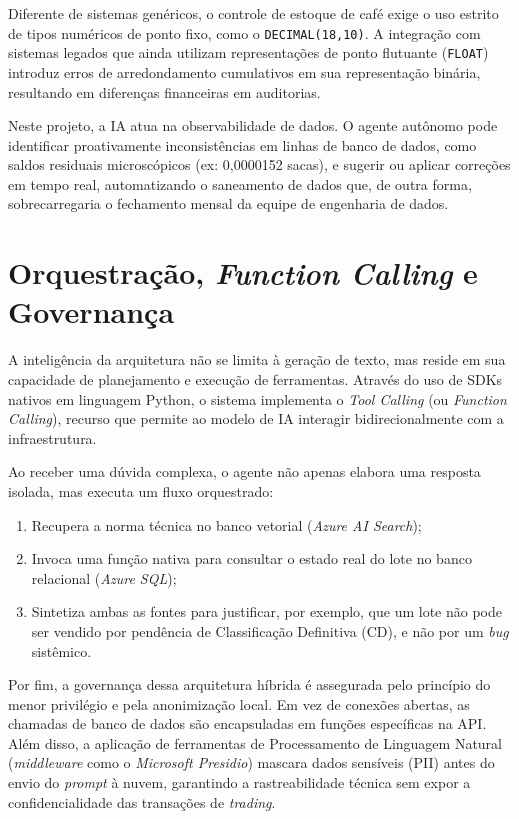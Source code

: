 Diferente de sistemas genéricos, o controle de estoque de café exige o uso estrito de tipos numéricos de ponto fixo, como o \texttt{DECIMAL(18,10)}. A integração com sistemas legados que ainda utilizam representações de ponto flutuante (\texttt{FLOAT}) introduz erros de arredondamento cumulativos em sua representação binária, resultando em diferenças financeiras em auditorias. 

Neste projeto, a IA atua na observabilidade de dados. O agente autônomo pode identificar proativamente inconsistências em linhas de banco de dados, como saldos residuais microscópicos (ex: 0,0000152 sacas), e sugerir ou aplicar correções em tempo real, automatizando o saneamento de dados que, de outra forma, sobrecarregaria o fechamento mensal da equipe de engenharia de dados.

\section{Orquestração, \textit{Function Calling} e Governança}

A inteligência da arquitetura não se limita à geração de texto, mas reside em sua capacidade de planejamento e execução de ferramentas. Através do uso de SDKs nativos em linguagem Python, o sistema implementa o \textit{Tool Calling} (ou \textit{Function Calling}), recurso que permite ao modelo de IA interagir bidirecionalmente com a infraestrutura.

Ao receber uma dúvida complexa, o agente não apenas elabora uma resposta isolada, mas executa um fluxo orquestrado:
\begin{enumerate}
    \item Recupera a norma técnica no banco vetorial (\textit{Azure AI Search});
    \item Invoca uma função nativa para consultar o estado real do lote no banco relacional (\textit{Azure SQL});
    \item Sintetiza ambas as fontes para justificar, por exemplo, que um lote não pode ser vendido por pendência de Classificação Definitiva (CD), e não por um \textit{bug} sistêmico.
\end{enumerate}

Por fim, a governança dessa arquitetura híbrida é assegurada pelo princípio do menor privilégio e pela anonimização local. Em vez de conexões abertas, as chamadas de banco de dados são encapsuladas em funções específicas na API. Além disso, a aplicação de ferramentas de Processamento de Linguagem Natural (\textit{middleware} como o \textit{Microsoft Presidio}) mascara dados sensíveis (PII) antes do envio do \textit{prompt} à nuvem, garantindo a rastreabilidade técnica sem expor a confidencialidade das transações de \textit{trading}.